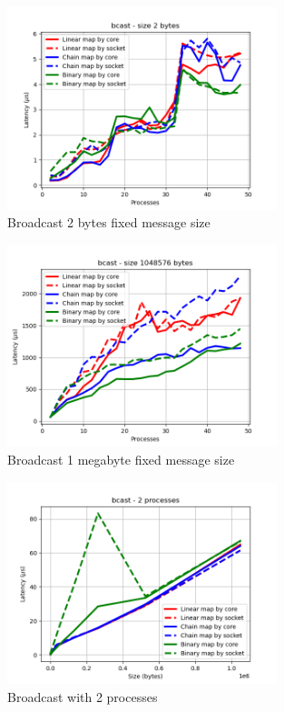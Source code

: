 \begin{figure}[h!]
    \centering
    \includegraphics[width=0.7\textwidth]{../plots/bcast_fixedSize2.png}
    \caption{Broadcast 2 bytes fixed message size}
    \label{fig:broadcast_fixed_message_size_2}
\end{figure}

\begin{figure}[h!]
    \centering
    \includegraphics[width=0.7\textwidth]{../plots/bcast_fixedSize1048576.png}
    \caption{Broadcast 1 megabyte fixed message size}
    \label{fig:broadcast_fixed_message_size_1048576}
\end{figure}

\begin{figure}[h!]
    \centering
    \includegraphics[width=0.7\textwidth]{../plots/bcast_fixedProcesses2.png}
    \caption{Broadcast with 2 processes}
    \label{fig:broadcast_fixed_processes_2}
\end{figure}

